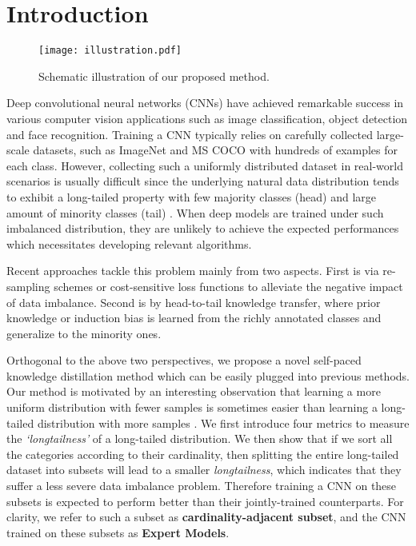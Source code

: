 \documentclass[runningheads]{llncs}
\begin{document}
	\section{Introduction}
	
	\begin{figure}[htbp!]
		\centering
		\texttt{[image: illustration.pdf]}
		\caption{Schematic illustration of our proposed method.}
		\label{fig:illustration}
	\end{figure}
	
	Deep convolutional neural networks (CNNs) have achieved remarkable success in various computer vision applications such as image classification, object detection and face recognition. Training a CNN typically relies on carefully collected large-scale datasets, such as ImageNet \cite{deng2009imagenet} and MS COCO \cite{lin2014microsoft} with hundreds of examples for each class. 
However, collecting such a uniformly distributed dataset in real-world scenarios is usually difficult since the underlying natural data distribution tends to exhibit a long-tailed property 
	with few majority classes (head) and large amount of minority classes (tail) \cite{ouyang2016factors,zhang2017range,oksuz2019imbalance}. 
	When deep models are trained under such imbalanced distribution, they are unlikely to achieve the expected performances which necessitates developing relevant algorithms. 


	Recent approaches tackle this problem mainly from two aspects. First is via re-sampling schemes or cost-sensitive loss functions to alleviate the negative impact of data imbalance. Second is by head-to-tail knowledge transfer, where prior knowledge or induction bias is learned from the richly annotated classes and generalize to the minority ones. 
	
	Orthogonal to the above two perspectives, we propose a novel self-paced knowledge distillation method which can be easily plugged into previous methods. Our method is motivated by an interesting observation that learning a more uniform distribution with fewer samples is sometimes easier than learning a long-tailed distribution with more samples \cite{ouyang2016factors}. We first introduce four metrics to measure the \emph{`longtailness'} of a long-tailed distribution. We then show that if we sort all the categories according to their cardinality, then splitting the entire long-tailed dataset into subsets will lead to a smaller \emph{longtailness}, which indicates that they suffer a less severe data imbalance problem. Therefore training a CNN on these subsets is expected to perform better than their jointly-trained counterparts.
	For clarity, we refer to such a subset as \textbf{cardinality-adjacent subset}, and the CNN trained on these subsets as \textbf{Expert Models}.
	
\end{document}
